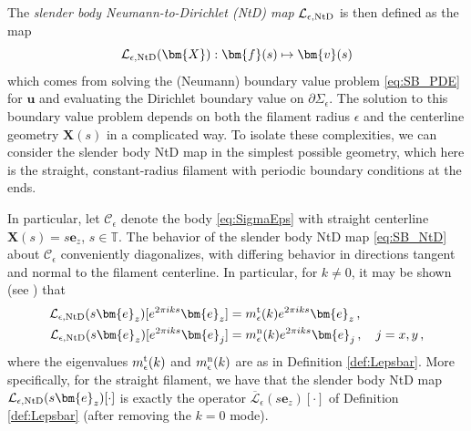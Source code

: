 \documentclass[11pt,reqno]{amsart}
\newcommand{\T}{\mathbb{T}}
\newcommand{\bu}{\bm{u}}
\newcommand{\X}{\bm{X}}
\newcommand{\be}{\bm{e}}
\newcommand{\p}{\partial}
\newcommand{\mc}[1]{\mathcal{#1}}
\numberwithin{equation}{section}
\theoremstyle{definition}
\begin{document}
The \emph{slender body Neumann-to-Dirichlet (NtD) map} $\mc{L}_{\epsilon,\rm NtD}$ is then defined as the map
\begin{equation}\label{eq:SB_NtD}
\mc{L}_{\epsilon,\rm NtD}(\X) : \bm{f}(s) \mapsto \bm{v}(s)
\end{equation}
which comes from solving the (Neumann) boundary value problem \eqref{eq:SB_PDE} for $\bu$ and evaluating the Dirichlet boundary value on $\p\Sigma_\epsilon$. The solution to this boundary value problem depends on both the filament radius $\epsilon$ and the centerline geometry $\X(s)$ in a complicated way. To isolate these complexities, we can consider the slender body NtD map in the simplest possible geometry, which here is the straight, constant-radius filament with periodic boundary conditions at the ends. 

 In particular, let $\mc{C}_\epsilon$ denote the body \eqref{eq:SigmaEps} with straight centerline $\X(s)=s\be_z$, $s\in \T$. The behavior of the slender body NtD map \eqref{eq:SB_NtD} about $\mc{C}_\epsilon$ conveniently diagonalizes, with differing behavior in directions tangent and normal to the filament centerline. In particular, for $k\neq 0$, it may be shown (see \cite{inverse}) that
 \begin{equation}\label{eq:eval_prob}
 \begin{aligned}
\mc{L}_{\epsilon,\rm NtD}(s\be_z)[e^{2\pi iks}\be_z] &= m_{\epsilon}^{\rm t}(k)e^{2\pi iks}\be_z\,, \\
\mc{L}_{\epsilon,\rm NtD}(s\be_z)[e^{2\pi iks}\be_j] &= m_{\epsilon}^{\rm n}(k)e^{2\pi iks}\be_j\,, \quad j=x,y \,,
\end{aligned}
\end{equation}
where the eigenvalues $m_{\epsilon}^{\rm t}(k)$ and $m_{\epsilon}^{\rm n}(k)$ are as in Definition \ref{def:Lepsbar}. More specifically, for the straight filament, we have that the slender body NtD map $\mc{L}_{\epsilon,\rm NtD}(s\be_z)[\cdot]$ is exactly the operator $\overline{\mc{L}}_\epsilon(s\be_z)[\cdot]$ of Definition \ref{def:Lepsbar} (after removing the $k=0$ mode).
\end{document}
